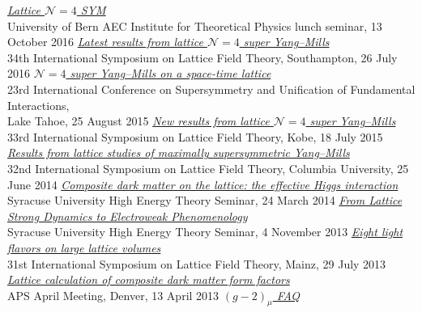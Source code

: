 \begin{spacelist}
\begin{revnumerate}
    \pagebreakitem
      \textit{\href{http://www.davidschaich.net/talks/latticeN4_Bern.pdf}{Lattice $\mathcal N = 4$ SYM}} \\
      University of Bern AEC Institute for Theoretical Physics lunch seminar, 13 October 2016
    \pagebreakitem
      \textit{\href{http://www.davidschaich.net/talks/lattice16.pdf}{Latest results from lattice $\mathcal N = 4$ super Yang--Mills}} \\
      34th International Symposium on Lattice Field Theory, Southampton, 26 July 2016
    \pagebreakitem
      \textit{\href{http://www.davidschaich.net/talks/SUSY15.pdf}{$\mathcal N = 4$ super Yang--Mills on a space-time lattice}} \\
      23rd International Conference on Supersymmetry and Unification of Fundamental Interactions, \\ Lake Tahoe, 25 August 2015
    \pagebreakitem
      \textit{\href{http://www.davidschaich.net/talks/lattice15.pdf}{New results from lattice $\mathcal N = 4$ super Yang--Mills}} \\
      33rd International Symposium on Lattice Field Theory, Kobe, 18 July 2015
    \pagebreakitem
      \textit{\href{http://www.davidschaich.net/talks/lattice14.pdf}{Results from lattice studies of maximally supersymmetric Yang--Mills}} \\
      32nd International Symposium on Lattice Field Theory, Columbia University, 25 June 2014
    \pagebreakitem
      \textit{\href{http://www.davidschaich.net/talks/LSD_SU4_1403.pdf}{Composite dark matter on the lattice: the effective Higgs interaction}} \\
      Syracuse University High Energy Theory Seminar, 24 March 2014
    \pagebreakitem
      \textit{\href{http://www.davidschaich.net/talks/LSD_EFT13.pdf}{From Lattice Strong Dynamics to Electroweak Phenomenology}} \\
      Syracuse University High Energy Theory Seminar, 4 November 2013
    \pagebreakitem
      \textit{\href{http://www.davidschaich.net/talks/lattice13.pdf}{Eight light flavors on large lattice volumes}} \\
      31st International Symposium on Lattice Field Theory, Mainz, 29 July 2013
    \pagebreakitem
      \textit{\href{http://www.davidschaich.net/talks/April13.pdf}{Lattice calculation of composite dark matter form factors}} \\
      APS April Meeting, Denver, 13 April 2013
    \pagebreakitem
      \textit{\href{http://www.davidschaich.net/talks/g-2_1209.pdf}{$(g - 2)_{\mu}$ FAQ}} \\

\end{revnumerate}
\end{spacelist}
